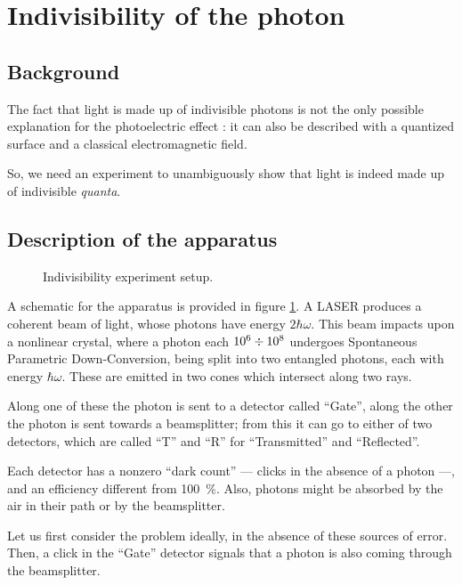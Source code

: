 \documentclass[main.tex]{subfiles}
\begin{document}
\section{Indivisibility of the photon}

\subsection{Background}

The fact that light is made up of indivisible photons is not the only possible explanation for the photoelectric effect \cite[]{thornObservingQuantumBehavior2004}: it can also be described with a quantized surface and a classical electromagnetic field. 

So, we need an experiment to unambiguously show that light is indeed made up of indivisible \emph{quanta}.

\subsection{Description of the apparatus}

\begin{figure}[ht]
\centering

\caption{Indivisibility experiment setup.}
\label{fig:spdc}
\end{figure}

A schematic for the apparatus is provided in figure \ref{fig:spdc}. 
A LASER produces a coherent beam of light, whose photons have energy \(2 \hbar \omega  \). This beam impacts upon a nonlinear crystal, where a photon each \(\num{e6} \divisionsymbol \num{e8}\) undergoes Spontaneous Parametric Down-Conversion, being split into two entangled photons, each with energy \(\hbar \omega \). 
These are emitted in two cones which intersect along two rays. 

Along one of these the photon is sent to a detector called ``Gate'', along the other the photon is sent towards a beamsplitter; from this it can go to either of two detectors, which are called ``T'' and ``R'' for ``Transmitted'' and ``Reflected''.

Each detector has a nonzero ``dark count'' --- clicks in the absence of a photon ---, and an efficiency different from \SI{100}{\percent}. Also, photons might be absorbed by the air in their path or by the beamsplitter.

Let us first consider the problem ideally, in the absence of these sources of error.
Then, a click in the ``Gate'' detector signals that a photon is also coming through the beamsplitter. 
\end{document}
